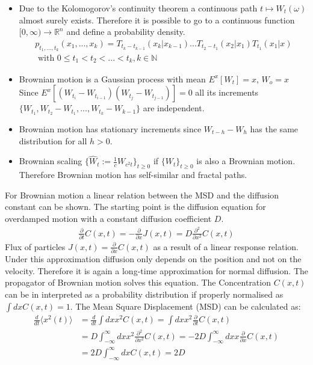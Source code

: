 \documentclass[
  a4paper,BCOR10mm,oneside,
  bibtotoc,idxtotoc,
  headsepline,footsepline,%
  fleqn,openbib
]{scrbook}
\begin{document}
\begin{itemize}
 \item Due to the Kolomogorov's continuity theorem a continuous path $ t \mapsto W_t(\omega)$ almost surely exists. Therefore it is possible to go to a continuous function $[0,\infty) \rightarrow \mathbb{R}^n$ and define a probability density.
\begin{align*}
p_{t_1,...,t_k}(x_1,...,x_k)  =T_{t_k -t_{k-1}}(x_k|x_{k-1}) ... T_{t_2 - t_1}(x_2|x_1) T_{t_1}(x_1|x)  \\
\text{ with }  0\leq t_1 < t_2 < ...< t_k,k \in \mathbb{N}
\end{align*}
\item Brownian motion is a Gaussian process with mean $E^x[W_t]=x$, $W_o=x$ 
Since $ E^x[(W_{t_i}-W_{t_{i-1}})(W_{t_j}-W_{t_{j-1}})]=0 $  all its increments $\{W_{t_1},W_{t_2}-W_{t_1},...,W_{t_k}-W_{k-1}\}$ are independent.

\item Brownian motion has stationary increments since ${W_{t-h}-W_{h}}$ has the same distribution for all $h>0$.

\item Brownian scaling $\{\hat{W}_t := \frac{1}{c} W_{c^2 t} \}_{t\geq0}$ if $\{W_t\}_{t \geq 0}$  is also a Brownian motion. Therefore Brownian motion has self-similar and fractal paths.
\end{itemize}
For Brownian motion a linear relation between the MSD and the diffusion constant can be shown. The starting point is the diffusion equation for overdamped motion with a constant diffusion coefficient $D$. 
\begin{align}
 \frac{\partial}{\partial t} C(x,t) = - \frac{\partial }{\partial x} J (x,t) = D  \frac{\partial^2 }{\partial x^2} C(x,t)
\end{align}
Flux of particles  $J(x,t)=\frac{\partial }{\partial x} C(x,t)$ as a result of a linear response relation. 
Under this approximation diffusion only depends on the position and not on the velocity. Therefore it is again a long-time approximation for normal diffusion. The propagator of Brownian motion solves this equation. The Concentration $C(x,t)$ can be in interpreted as a probability distribution if properly normalised as $\int dx C(x,t)=1$. The Mean Square Displacement (MSD) can be calculated as:
\begin{align}
 \frac{d}{dt} \langle x^2(t)\rangle & =\frac{d}{dt} \int dx x^2 C(x,t)=\int dx x^2 \frac{\partial}{\partial t} C(x,t) \\
&= D \int_{-\infty}^{\infty}dx x^2 \frac{\partial^2 }{\partial x^2} C(x,t) = -2 D \int_{-\infty}^{\infty} dx x \frac{\partial }{\partial x} C(x,t) \\ &= 2 D \int_{-\infty}^{\infty} dx C(x,t) =2 D
\end{align}
\end{document}
